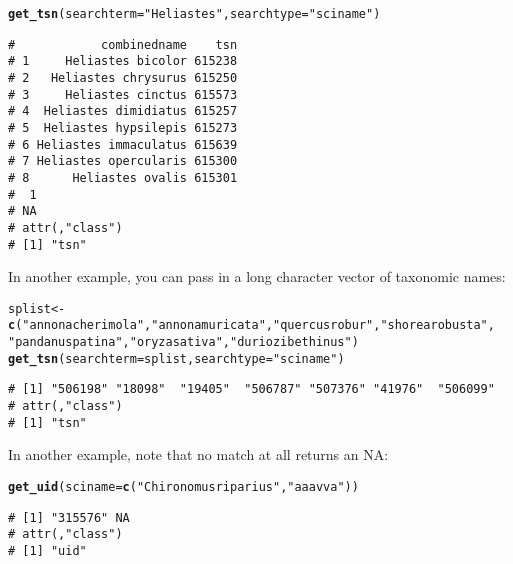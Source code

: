 \documentclass[10pt,a4paper,twocolumn]{article}\usepackage[]{graphicx}\usepackage[]{color}
\makeatletter
\newcommand{\hlstr}[1]{\textcolor[rgb]{0.192,0.494,0.8}{#1}}%
\newcommand{\hlstd}[1]{\textcolor[rgb]{0.345,0.345,0.345}{#1}}%
\newcommand{\hlkwb}[1]{\textcolor[rgb]{0.69,0.353,0.396}{#1}}%
\newcommand{\hlkwc}[1]{\textcolor[rgb]{0.333,0.667,0.333}{#1}}%
\newcommand{\hlkwd}[1]{\textcolor[rgb]{0.737,0.353,0.396}{\textbf{#1}}}%
\newenvironment{kframe}{%
 \def\at@end@of@kframe{}%
 \ifinner\ifhmode%
  \def\at@end@of@kframe{\end{minipage}}%
  \begin{minipage}{\columnwidth}%
 \fi\fi%
 \def\FrameCommand##1{\hskip\@totalleftmargin \hskip-\fboxsep
 \colorbox{shadecolor}{##1}\hskip-\fboxsep
     \hskip-\linewidth \hskip-\@totalleftmargin \hskip\columnwidth}%
 \MakeFramed {\advance\hsize-\width
   \@totalleftmargin\z@ \linewidth\hsize
   \@setminipage}}%
 {\par\unskip\endMakeFramed%
 \at@end@of@kframe}
\newenvironment{knitrout}{}{} %
\makeatother
\begin{document}
\begin{knitrout}\scriptsize
{}\color{fgcolor}\begin{kframe}
\begin{alltt}
\hlkwd{get_tsn}\hlstd{(}\hlkwc{searchterm} \hlstd{=} \hlstr{"Heliastes"}\hlstd{,} \hlkwc{searchtype} \hlstd{=} \hlstr{"sciname"}\hlstd{)}
\end{alltt}
\begin{verbatim}
#            combinedname    tsn
# 1     Heliastes bicolor 615238
# 2   Heliastes chrysurus 615250
# 3     Heliastes cinctus 615573
# 4  Heliastes dimidiatus 615257
# 5  Heliastes hypsilepis 615273
# 6 Heliastes immaculatus 615639
# 7 Heliastes opercularis 615300
# 8      Heliastes ovalis 615301
#  1 
# NA 
# attr(,"class")
# [1] "tsn"
\end{verbatim}
\end{kframe}
\end{knitrout}



In another example, you can pass in a long character vector of taxonomic names:

\begin{knitrout}\scriptsize
{}\color{fgcolor}\begin{kframe}
\begin{alltt}
\hlstd{splist} \hlkwb{<-} \hlkwd{c}\hlstd{(}\hlstr{"annona cherimola"}\hlstd{,} \hlstr{"annona muricata"}\hlstd{,} \hlstr{"quercus robur"}\hlstd{,} \hlstr{"shorea robusta"}\hlstd{,}
    \hlstr{"pandanus patina"}\hlstd{,} \hlstr{"oryza sativa"}\hlstd{,} \hlstr{"durio zibethinus"}\hlstd{)}
\hlkwd{get_tsn}\hlstd{(}\hlkwc{searchterm} \hlstd{= splist,} \hlkwc{searchtype} \hlstd{=} \hlstr{"sciname"}\hlstd{)}
\end{alltt}
\begin{verbatim}
# [1] "506198" "18098"  "19405"  "506787" "507376" "41976"  "506099"
# attr(,"class")
# [1] "tsn"
\end{verbatim}
\end{kframe}
\end{knitrout}


In another example, note that no match at all returns an NA:

\begin{knitrout}\scriptsize
{}\color{fgcolor}\begin{kframe}
\begin{alltt}
\hlkwd{get_uid}\hlstd{(}\hlkwc{sciname} \hlstd{=} \hlkwd{c}\hlstd{(}\hlstr{"Chironomus riparius"}\hlstd{,} \hlstr{"aaa vva"}\hlstd{))}
\end{alltt}
\begin{verbatim}
# [1] "315576" NA      
# attr(,"class")
# [1] "uid"
\end{verbatim}
\end{kframe}
\end{knitrout}
\end{document}
